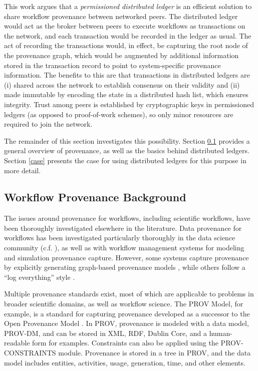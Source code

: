 This work argues that a \textit{permissioned distributed ledger} is an efficient
solution to share workflow provenance between networked peers. The distributed
ledger would act as the broker between peers to execute workflows as
transactions on the network, and each transaction would be recorded in the
ledger as usual. The act of recording the transactions would, in effect, be
capturing the root node of the provenance graph, which would be augmented by
additional information stored in the transaction record to point to
system-specific provenance information. The benefits to this are that
transactions in distributed ledgers are (i) shared across the network to
establish consensus on their validity and (ii) made immutable by encoding the
state in a distributed hash list, which ensures integrity. Trust among peers is
established by cryptographic keys in permissioned ledgers (as opposed to
proof-of-work schemes), so only minor resources are required to join the
network.

The remainder of this section investigates this possibility. Section
\ref{provenance-background} provides a general overview of provenance, as well
as the basics behind distributed ledgers. Section \ref{case} presents the case for using
distributed ledgers for this purpose in more detail.

\subsection{Workflow Provenance Background}
\label{provenance-background}

The issues around provenance for workflows, including scientific workflows, have
been thoroughly investigated elsewhere in the literature. Data provenance for
workflows has been investigated particularly thoroughly in the data science
community (c.f. \cite{davidson_provenance_2007}), as well as with workflow
management systems for modeling and simulation provenance capture. However,
some systems capture provenance by explicitly generating graph-based
provenance models \cite{pizzi_aiida:_2016}, while others follow a ``log
everything'' style \cite{billings_eclipse_2017}.

Multiple provenance standards exist, most of which are applicable to problems in
broader scientific domains, as well as workflow science. The PROV Model, for
example, is a standard for capturing provenance developed as a successor to the
Open Provenance Model \cite{noauthor_prov-overview_nodate}
\cite{moreau_open_2011}. In PROV, provenance is modeled with a data model,
PROV-DM, and can be stored in XML, RDF, Dublin Core, and a human-readable form
for examples. Constraints can also be applied using the PROV-CONSTRAINTS module.
Provenance is stored in a tree in PROV, and the data model includes entities,
activities, usage, generation, time, and other elements.


